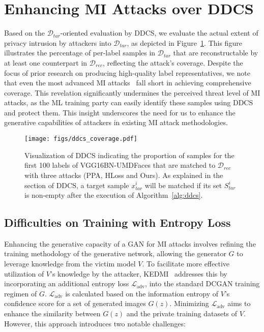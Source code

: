 \section{Enhancing MI Attacks over DDCS}
\label{sec:gan_aug}
Based on the $\mathcal{D}_{tar}$-oriented evaluation by DDCS, we evaluate the actual extent of privacy intrusion by attackers into $\mathcal{D}_{tar}$, as depicted in Figure~\ref{fig:ddcs_coverage}.
This figure illustrates the percentage of per-label samples in $\mathcal{D}_{tar}$ that are reconstructable by at least one counterpart in $\mathcal{D}_{rec}$, reflecting the attack's coverage.
Despite the focus of prior research on producing high-quality label representatives, we note that even the most advanced MI attacks~\cite{ppa22icml} fall short in achieving comprehensive coverage.
This revelation significantly undermines the perceived threat level of MI attacks, as the ML training party can easily identify these samples using DDCS and protect them.
This insight underscores the need for us to enhance the generative capabilities of attackers in existing MI attack methodologies.

\begin{figure}[htb]%
	\centering
	\texttt{[image: figs/ddcs\_coverage.pdf]}
 \vspace{-0.1in}
	\caption{Visualization of DDCS indicating the proportion of samples for the first 100 labels of VGG16BN-UMDFaces that are matched to $\mathcal{D}_{rec}$ with three attacks (PPA, HLoss and Ours). As explained in the section of DDCS, a target sample $x^i_{tar}$ will be matched if its set $S^i_{tar}$ is non-empty after the execution of Algorithm~\ref{alg:ddcs}.}
	\label{fig:ddcs_coverage}
\end{figure}

\subsection{Difficulties on Training with Entropy Loss}
Enhancing the generative capacity of a GAN for MI attacks involves refining the training methodology of the generative network, allowing the generator $G$ to leverage knowledge from the victim model $V$. To facilitate more effective utilization of $V$'s knowledge by the attacker, KEDMI~\cite{kedmi21iccv} addresses this by incorporating an additional entropy loss $\mathcal{L}_{\text{adv}}$, into the standard DCGAN training regimen of $G$.
$\mathcal{L}_{\text{adv}}$ is calculated based on the information entropy of $V$'s confidence score for a set of generated images $G(z)$.
Minimizing $\mathcal{L}_{\text{adv}}$ aims to enhance the similarity between $G(z)$ and the private training datasets of $V$.
However, this approach introduces two notable challenges:

